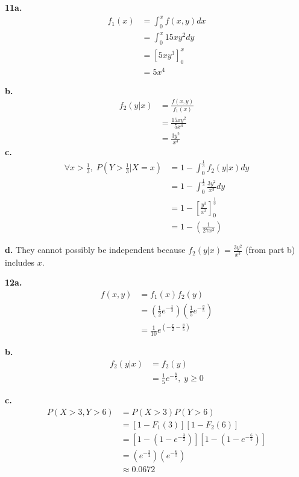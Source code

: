 \documentclass[12pt]{report}
\begin{document}
\pagebreak
\noindent \textbf{11a.} 
\begin{align*}
f_1(x) &= \int_0^xf(x,y)dx\\
&= \int_{0}^x15xy^2dy\\
&= \left[5xy^3\right]_0^x\\
&= \boxed{5x^4}
\end{align*}

\noindent \textbf{b.}
\begin{align*}
f_2(y|x) &= \frac{f(x,y)}{f_1(x)}\\
&= \frac{15xy^2}{5x^4}\\
&= \boxed{\frac{3y^2}{x^3}}
\end{align*}
\noindent \textbf{c.}
\begin{align*}
\forall x > \frac{1}{3}, \;P(Y > \frac{1}{3}|X = x) &= 1 - \int_0^\frac{1}{3} f_2(y|x)dy\\
&= 1- \int_0^\frac{1}{3} \frac{3y^2}{x^3}dy\\
&= 1-\left[\frac{y^3}{x^3}\right]_0^\frac{1}{3}\\
&= \boxed{1 - \left(\frac{1}{27x^3}\right)}
\end{align*}

\noindent \textbf{d.} They cannot possibly be independent because $f_2(y|x) = \frac{3y^2}{x^3}$ (from part b) includes $x$. \\
\pagebreak

\noindent \textbf{12a.} 
\begin{align*}
f(x,y) &= f_1(x)f_2(y) \\
&= \left(\frac{1}{2}e^{-\frac{x}{2}}\right)\left(\frac{1}{5}e^{-\frac{y}{5}}\right)\\
&= \boxed{\frac{1}{10}e^{\left(-\frac{x}{2} - \frac{y}{5}\right)}}
\end{align*}

\noindent \textbf{b.}
\begin{align*}
f_2(y|x) &= f_2(y)\\
&= \boxed{\frac{1}{5}e^{-\frac{y}{5}}, \; y \geq 0}
\end{align*}

\noindent \textbf{c.} 
\begin{align*}
P(X > 3, Y > 6) &= P(X > 3)P(Y > 6)\\
&= [1 - F_1(3)][1 - F_2(6)]\\
&= \left[1 - \left(1 - e^{-\frac{3}{2}}\right)\right]\left[1 - \left(1 - e^{-\frac{6}{5}}\right)\right]\\
&= \left(e^{-\frac{3}{2}}\right)\left(e^{-\frac{6}{5}}\right)\\
&\approx \boxed{0.0672}
\end{align*}
\end{document}
